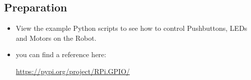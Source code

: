 

\subsection*{\Large Preparation}

    \begin{itemize}
        \item View the example Python scripts to see how to control Pushbuttons, LEDs and  Motors on the Robot.\\
        \item you can find a reference here: 
        
        \small{\url{https://pypi.org/project/RPi.GPIO/}}\\ 
        
    \end{itemize}
